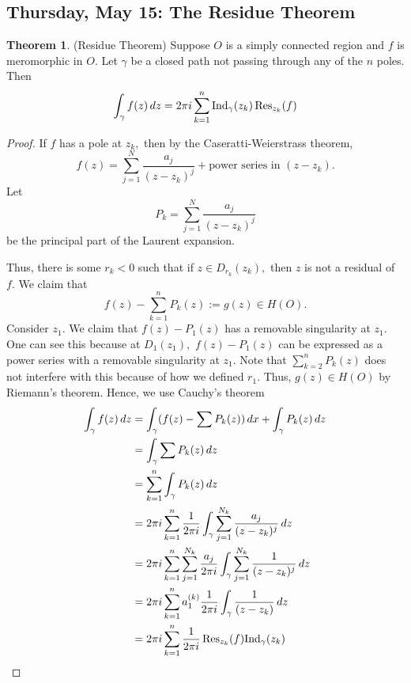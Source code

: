 \documentclass[10pt, oneside]{article}
\newcommand{\Ind}{\text{Ind}}
\theoremstyle{definition}
\newtheorem{thm}{Theorem}
\begin{document}
\subsection{Thursday, May 15: The Residue Theorem}
\begin{thm} (Residue Theorem)
    Suppose $O$ is a simply connected region and $f$ is meromorphic in $O.$  Let $\gamma$ be a closed path not passing through any of the $n$ poles. Then 
    \[\int_\gamma f(z)\,dz = 2\pi i \sum_{k = 1}^n\Ind_\gamma (z_k)\Res_{z_k}(f)\]
\end{thm}
\begin{proof}
    If $f$ has a pole at $z_k,$ then by the Caseratti-Weierstrass theorem,
    \[f(z) = \sum_{j=1}^N \frac{a_j}{(z - z_k)^j} + \text{power series in $(z-z_k)$}.\] Let 
    \[P_k = \sum_{j=1}^N\frac{a_j}{(z - z_k)^j}\] be the principal part of the Laurent expansion.
    
    Thus, there is some $r_k<0$ such that if $z \in D_{r_k}(z_k),$ then $z$ is not a residual of $f.$ We claim that 
    \[f(z) - \sum_{k=1}^n P_k(z):= g(z)\in H(O).\] Consider $z_1.$ We claim that $f(z) - P_1(z)$ has a removable singularity at $z_1.$ One can see this because at $D_1(z_1),$ $f(z) - P_1(z)$ can be expressed as a power series with a removable singularity at $z_1.$ Note that $\sum_{k=2}^n P_k(z)$ does not interfere with this because of how we defined $r_1.$ Thus, $g(z)\in H(O)$ by Riemann's theorem. Hence, we use Cauchy's theorem
    \begin{align*}
    \int_\gamma f(z)\,dz &= \int_\gamma (f(z) - \sum P_k(z))\,dx + \int_\gamma P_k(z) \,dz\\ &= \int_\gamma \sum P_k(z) \,dz \\
    &= \sum_{k=1}^n \int_\gamma P_k(z)\,dz\\
    &= 2\pi i \sum_{k=1}^n \frac{1}{2\pi i}\int_\gamma \sum_{j=1}^{N_k} \frac{a_j}{(z - z_k)^j}\,dz\\
    &= 2\pi i \sum_{k=1}^n \sum_{j=1}^{N_k}\frac{a_j}{2\pi i}\int_\gamma \sum_{j=1}^{N_k} \frac{1}{(z - z_k)^j}\,dz\\
    &= 2\pi i \sum_{k=1}^n a_1^{(k)}\frac{1}{2\pi i}\int_\gamma\frac{1}{(z - z_k)}\,dz\\
    &=2\pi i \sum_{k=1}^n \frac{1}{2\pi i} \Res_{z_k}(f) \Ind_\gamma(z_k)
    \end{align*}
    
\end{proof}
\end{document}
